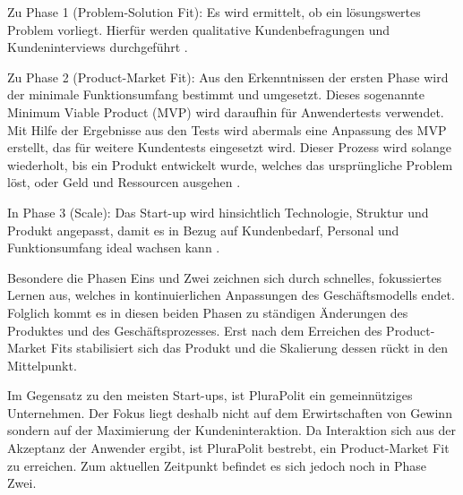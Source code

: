 Zu Phase 1 (Problem-Solution Fit):
Es wird ermittelt, ob ein lösungswertes Problem vorliegt. Hierfür werden qualitative Kundenbefragungen und Kundeninterviews durchgeführt \parencite[vgl.][S. 170 ff.]{croll_lean_2013}.

Zu Phase 2 (Product-Market Fit):
 Aus den Erkenntnissen der ersten Phase wird der minimale Funktionsumfang bestimmt und umgesetzt. Dieses sogenannte Minimum Viable Product (MVP) wird daraufhin für Anwendertests verwendet. Mit Hilfe der Ergebnisse aus den Tests wird abermals eine Anpassung des MVP erstellt, das für weitere Kundentests eingesetzt wird. Dieser Prozess wird solange wiederholt, bis ein Produkt entwickelt wurde, welches das ursprüngliche Problem löst, oder Geld und Ressourcen ausgehen \parencite[vgl.][S. 28]{croll_lean_2013}.

In Phase 3 (Scale):
Das Start-up wird hinsichtlich Technologie, Struktur und Produkt angepasst, damit es in Bezug auf Kundenbedarf, Personal und Funktionsumfang ideal wachsen kann \parencite[vgl.][S. 9]{maurya_running_2012}.

Besondere die Phasen Eins und Zwei zeichnen sich durch schnelles, fokussiertes Lernen aus, welches in kontinuierlichen Anpassungen des Geschäftsmodells endet. Folglich kommt es in diesen beiden Phasen zu ständigen Änderungen des Produktes und des Geschäftsprozesses. Erst nach dem Erreichen des Product-Market Fits stabilisiert sich das Produkt und die Skalierung dessen rückt in den Mittelpunkt.

Im Gegensatz zu den meisten Start-ups, ist PluraPolit ein gemeinnütziges Unternehmen. Der Fokus liegt deshalb nicht auf dem Erwirtschaften von Gewinn sondern auf der Maximierung der Kundeninteraktion. Da Interaktion sich aus der Akzeptanz der Anwender ergibt, ist PluraPolit bestrebt, ein Product-Market Fit zu erreichen. Zum aktuellen Zeitpunkt befindet es sich jedoch noch in Phase Zwei.
